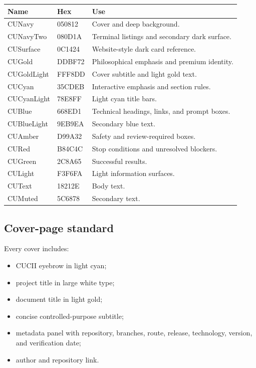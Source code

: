 \documentclass[11pt,letterpaper]{article}
\begin{document}
\begin{tabularx}{\textwidth}{L{1.5in}L{1.0in}Y}
\toprule
\textbf{Name} & \textbf{Hex} & \textbf{Use} \\
\midrule
CUNavy & 050812 & Cover and deep background. \\
CUNavyTwo & 080D1A & Terminal listings and secondary dark surface. \\
CUSurface & 0C1424 & Website-style dark card reference. \\
CUGold & DDBF72 & Philosophical emphasis and premium identity. \\
CUGoldLight & FFF8DD & Cover subtitle and light gold text. \\
CUCyan & 35CDEB & Interactive emphasis and section rules. \\
CUCyanLight & 78E8FF & Light cyan title bars. \\
CUBlue & 668ED1 & Technical headings, links, and prompt boxes. \\
CUBlueLight & 9EB9EA & Secondary blue text. \\
CUAmber & D99A32 & Safety and review-required boxes. \\
CURed & B84C4C & Stop conditions and unresolved blockers. \\
CUGreen & 2C8A65 & Successful results. \\
CULight & F3F6FA & Light information surfaces. \\
CUText & 18212E & Body text. \\
CUMuted & 5C6878 & Secondary text. \\
\bottomrule
\end{tabularx}

\subsection{Cover-page standard}

Every cover includes:

\begin{itemize}
    \item CUCII eyebrow in light cyan;
    \item project title in large white type;
    \item document title in light gold;
    \item concise controlled-purpose subtitle;
    \item metadata panel with repository, branches, route, release, technology,
          version, and verification date;
    \item author and repository link.
\end{itemize}
\end{document}
